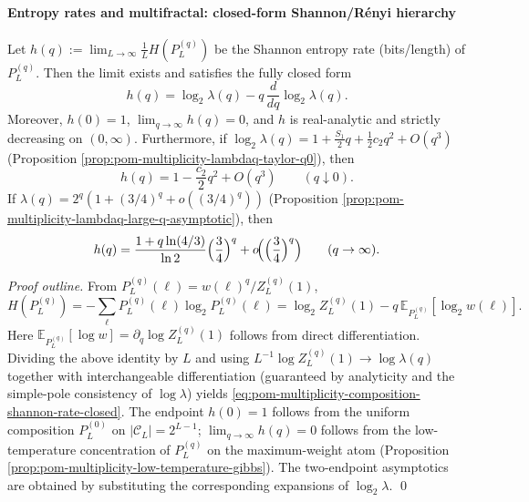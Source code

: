 \paragraph{Entropy rates and multifractal: closed-form Shannon/R\'enyi hierarchy}
\begin{proposition}\label{prop:pom-multiplicity-composition-shannon-entropy-rate-generalq}
Let
\(
h(q):=\lim_{L\to\infty}\frac{1}{L}H(P_L^{(q)})
\)
be the Shannon entropy rate (bits/length) of \(P_L^{(q)}\).
Then the limit exists and satisfies the fully closed form
\begin{equation}\label{eq:pom-multiplicity-composition-shannon-rate-closed}
\boxed{\;
h(q)=\log_2\lambda(q)-q\,\frac{d}{dq}\log_2\lambda(q).\;}
\end{equation}
Moreover, \(h(0)=1\), \(\lim_{q\to\infty}h(q)=0\), and \(h\) is real-analytic and strictly decreasing on \((0,\infty)\).
Furthermore, if \(\log_2\lambda(q)=1+\frac{S_1}{2}q+\frac12 c_2 q^2+O(q^3)\) (Proposition \ref{prop:pom-multiplicity-lambdaq-taylor-q0}), then
\[
h(q)=1-\frac{c_2}{2}q^2+O(q^3)\qquad(q\downarrow 0).
\]
If \(\lambda(q)=2^q(1+(3/4)^q+o((3/4)^q))\) (Proposition \ref{prop:pom-multiplicity-lambdaq-large-q-asymptotic}), then
\[
h(q)=\frac{1+q\ln(4/3)}{\ln 2}\Bigl(\frac34\Bigr)^{q}+o\!\Bigl(\Bigl(\frac34\Bigr)^{q}\Bigr)\qquad(q\to\infty).
\]
\end{proposition}
\begin{proof}[Proof outline]
From \(P_L^{(q)}(\boldsymbol{\ell})=w(\boldsymbol{\ell})^q/Z_L^{(q)}(1)\),
\[
H(P_L^{(q)})
=-\sum_{\boldsymbol{\ell}}P_L^{(q)}(\boldsymbol{\ell})\log_2 P_L^{(q)}(\boldsymbol{\ell})
=\log_2 Z_L^{(q)}(1)-q\,\mathbb{E}_{P_L^{(q)}}[\log_2 w(\boldsymbol{\ell})].
\]
Here
\(
\mathbb{E}_{P_L^{(q)}}[\log w]=\partial_q \log Z_L^{(q)}(1)
\)
follows from direct differentiation.
Dividing the above identity by \(L\) and using
\(
L^{-1}\log Z_L^{(q)}(1)\to \log\lambda(q)
\)
together with interchangeable differentiation (guaranteed by analyticity and the simple-pole consistency of \(\log\lambda\)) yields \eqref{eq:pom-multiplicity-composition-shannon-rate-closed}.
The endpoint \(h(0)=1\) follows from the uniform composition \(P_L^{(0)}\) on \(|\mathcal{C}_L|=2^{L-1}\);
\(\lim_{q\to\infty}h(q)=0\) follows from the low-temperature concentration of \(P_L^{(q)}\) on the maximum-weight atom (Proposition \ref{prop:pom-multiplicity-low-temperature-gibbs}).
The two-endpoint asymptotics are obtained by substituting the corresponding expansions of \(\log_2\lambda\). \qed
\end{proof}

